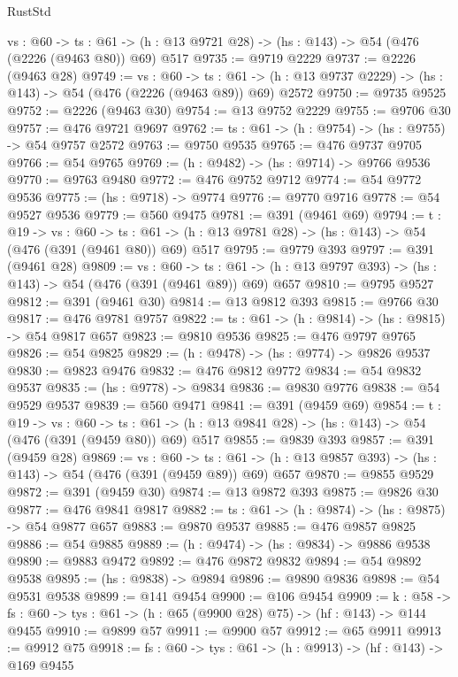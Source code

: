 \begin{lexlean}{RustStd}
\begin{coremodule}
  {vs : @60} ->
  {ts : @61} -> (h : @13 @9721 @28) -> (hs : @143) -> @54 (@476 (@2226 (@9463 @80)) @69) @517
@9735 := @9719 @2229
@9737 := @2226 (@9463 @28)
@9749 := {vs : @60} ->
  {ts : @61} -> (h : @13 @9737 @2229) -> (hs : @143) -> @54 (@476 (@2226 (@9463 @89)) @69) @2572
@9750 := @9735 @9525
@9752 := @2226 (@9463 @30)
@9754 := @13 @9752 @2229
@9755 := @9706 @30
@9757 := @476 @9721 @9697
@9762 := {ts : @61} -> (h : @9754) -> (hs : @9755) -> @54 @9757 @2572
@9763 := @9750 @9535
@9765 := @476 @9737 @9705
@9766 := @54 @9765
@9769 := (h : @9482) -> (hs : @9714) -> @9766 @9536
@9770 := @9763 @9480
@9772 := @476 @9752 @9712
@9774 := @54 @9772 @9536
@9775 := (hs : @9718) -> @9774
@9776 := @9770 @9716
@9778 := @54 @9527 @9536
@9779 := @560 @9475
@9781 := @391 (@9461 @69)
@9794 := {t : @19} ->
  {vs : @60} ->
  {ts : @61} -> (h : @13 @9781 @28) -> (hs : @143) -> @54 (@476 (@391 (@9461 @80)) @69) @517
@9795 := @9779 @393
@9797 := @391 (@9461 @28)
@9809 := {vs : @60} ->
  {ts : @61} -> (h : @13 @9797 @393) -> (hs : @143) -> @54 (@476 (@391 (@9461 @89)) @69) @657
@9810 := @9795 @9527
@9812 := @391 (@9461 @30)
@9814 := @13 @9812 @393
@9815 := @9766 @30
@9817 := @476 @9781 @9757
@9822 := {ts : @61} -> (h : @9814) -> (hs : @9815) -> @54 @9817 @657
@9823 := @9810 @9536
@9825 := @476 @9797 @9765
@9826 := @54 @9825
@9829 := (h : @9478) -> (hs : @9774) -> @9826 @9537
@9830 := @9823 @9476
@9832 := @476 @9812 @9772
@9834 := @54 @9832 @9537
@9835 := (hs : @9778) -> @9834
@9836 := @9830 @9776
@9838 := @54 @9529 @9537
@9839 := @560 @9471
@9841 := @391 (@9459 @69)
@9854 := {t : @19} ->
  {vs : @60} ->
  {ts : @61} -> (h : @13 @9841 @28) -> (hs : @143) -> @54 (@476 (@391 (@9459 @80)) @69) @517
@9855 := @9839 @393
@9857 := @391 (@9459 @28)
@9869 := {vs : @60} ->
  {ts : @61} -> (h : @13 @9857 @393) -> (hs : @143) -> @54 (@476 (@391 (@9459 @89)) @69) @657
@9870 := @9855 @9529
@9872 := @391 (@9459 @30)
@9874 := @13 @9872 @393
@9875 := @9826 @30
@9877 := @476 @9841 @9817
@9882 := {ts : @61} -> (h : @9874) -> (hs : @9875) -> @54 @9877 @657
@9883 := @9870 @9537
@9885 := @476 @9857 @9825
@9886 := @54 @9885
@9889 := (h : @9474) -> (hs : @9834) -> @9886 @9538
@9890 := @9883 @9472
@9892 := @476 @9872 @9832
@9894 := @54 @9892 @9538
@9895 := (hs : @9838) -> @9894
@9896 := @9890 @9836
@9898 := @54 @9531 @9538
@9899 := @141 @9454
@9900 := @106 @9454
@9909 := {k : @58} ->
  {fs : @60} -> {tys : @61} -> (h : @65 (@9900 @28) @75) -> (hf : @143) -> @144 @9455
@9910 := @9899 @57
@9911 := @9900 @57
@9912 := @65 @9911
@9913 := @9912 @75
@9918 := {fs : @60} -> {tys : @61} -> (h : @9913) -> (hf : @143) -> @169 @9455

\end{coremodule}
\end{lexlean}
